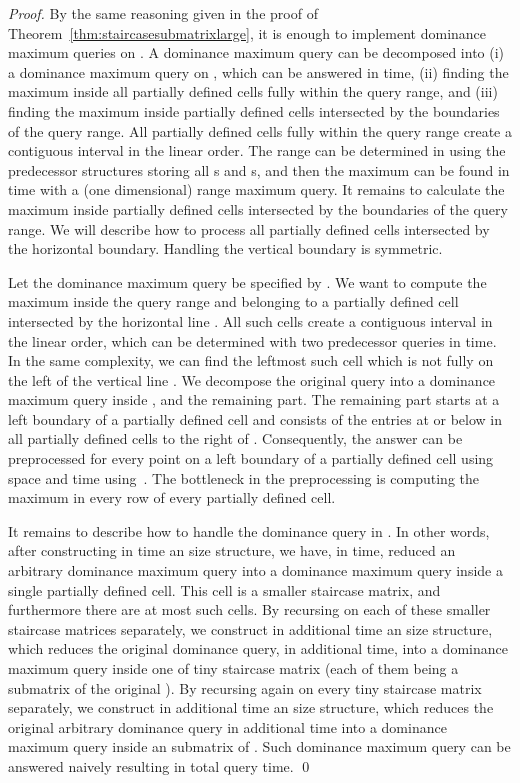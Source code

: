 \documentclass{llncs}
\begin{document}
\begin{proof}
By the same reasoning given in the proof of Theorem~\ref{thm:staircasesubmatrixlarge}, it is enough
to implement dominance maximum queries on . A dominance maximum query can be
decomposed into (i) a dominance maximum query on , which can be answered
in  time, (ii) finding the maximum inside all partially defined cells fully within
the query range, and (iii) finding the maximum inside partially defined cells intersected by the
boundaries of the query range. All partially defined cells fully within the query range create
a contiguous interval in the linear order. The range can be determined in 
using the predecessor structures storing all s and s, and then the maximum can
be found in  time with a (one dimensional) range maximum query. It remains to calculate the maximum inside partially defined cells
intersected by the boundaries of the query range. We will describe how to process all partially
defined cells intersected by the horizontal boundary. Handling the vertical boundary is symmetric.

Let the dominance maximum query be specified by . We want to compute the maximum
inside the query range and belonging to a partially defined cell intersected by the horizontal line .
All such cells create a contiguous interval in the linear order, which can be determined
with two predecessor queries in  time. In the same complexity, we can find
the leftmost such cell  which is not fully on the left of the vertical line . We decompose
the original query into a dominance maximum query inside , and the remaining
part. The remaining part starts at a left boundary of a partially defined cell and consists
of the entries at or below  in all partially defined cells to
the right of .
Consequently, the answer can be preprocessed
for every point on a left boundary of a partially defined cell using 
space and  time using~\cite{KK89}.
The bottleneck in the preprocessing is computing the maximum in every row of every
partially defined cell.

It remains to describe how to handle the dominance query in . In
other words, after constructing in  time an  size
structure, we have,  in  time, 
reduced an arbitrary dominance maximum query into a dominance maximum query inside
a single partially defined cell. This cell is a smaller  staircase
 matrix, and furthermore there are at most  such cells. By recursing on each of
 these smaller staircase matrices separately, we construct in
 additional  time an
  size structure, which reduces the
 original dominance query, in
 additional  time, into 
 a dominance maximum query inside one of  tiny 
 staircase matrix (each of them being a submatrix of the original ). By recursing again
 on every tiny staircase matrix separately,
 we construct in additional  time an  size
 structure, which reduces the original arbitrary dominance query in
 additional   time  into a dominance maximum query inside 
 an  submatrix of . Such dominance maximum
 query can be answered naively resulting in  total query time.
 \qed \end{proof}
\end{document}
